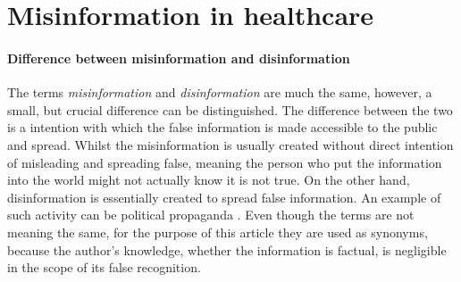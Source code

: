 \documentclass[11pt ,english,a4paper]{article}
\begin{document}
\section{Misinformation in healthcare}\label{mih}

\paragraph{Difference between misinformation and disinformation}
The terms \emph{misinformation} and \emph{disinformation} are much the same, however, a small, but crucial difference can be distinguished. The difference between the two is a intention with which the false information is made accessible to the public and spread. Whilst the misinformation is usually created without direct intention of misleading and spreading false, meaning the person who put the information into the world might not actually know it is not true. On the other hand, disinformation is essentially created to spread false information. An example of such activity can be political propaganda \cite{gu20misinfo} \cite{cook15misinfo}. Even though the terms are not meaning the same, for the purpose of this article they are used as synonyms, because the author's knowledge, whether the information is factual, is negligible in the scope of its false recognition.



\end{document}
